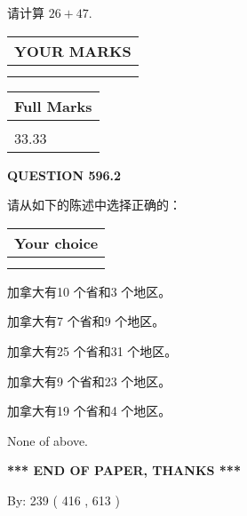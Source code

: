 \documentclass{ctexart}
\begin{document}
  
 
请计算 $ %
26 +  %
47 $.
 

 

 
  
\vspace{0.2in}
  
\noindent\begin{tabular}{|l|}
\hline
 YOUR MARKS  \\
\hline
 \\ 
 \\ 
\hline
\end{tabular}
\hspace{0.05in} \begin{tabular}{|l|}
\hline
 Full Marks  \\
\hline
 \\ 
33.33 \\
\hline
\end{tabular}
{\textbf{\Large{QUESTION
596.2 
}}}
  
  
请从如下的陈述中选择正确的：
  
  
\noindent\hspace{3.0in} \begin{tabular}{|l|}
\hline
Your choice \\
\hline
 \\ 
 \\ 
\hline
\end{tabular}
  
  
 
 
加拿大有10 个省和3 个地区。
 
 
加拿大有7 个省和9 个地区。
 
 
加拿大有25 个省和31 个地区。
 
 
加拿大有9 个省和23 个地区。
 
 
加拿大有19 个省和4 个地区。
 
 
 None of above.
 
 
   
   
 \vspace{0.2in}
 
   
   
   
   
\vspace{1.0in} 
{\textbf{\large{ *** END OF PAPER, THANKS *** }}} 
   
   
\hspace{1.0in} By: 
 239 ( 416 ,  613 )
   
\end{document}
